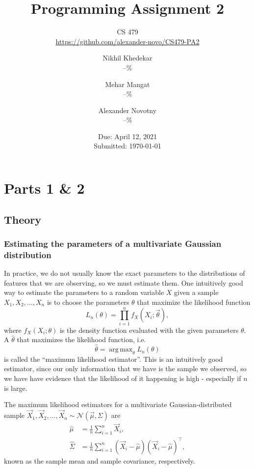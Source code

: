 \documentclass[headings=optiontoheadandtoc,listof=totoc,parskip=full]{scrartcl}
\title{Programming Assignment 2}
\subtitle{CS 479\\\url{https://github.com/alexander-novo/CS479-PA2}}
\author{Nikhil Khedekar\\--\% \and Mehar Mangat\\--\% \and Alexander Novotny\\--\%}
\date{Due: April 12, 2021 \\ Submitted: \today}
\DeclareMathOperator*{\argmax}{arg\,max}
\begin{document}
\maketitle
\tableofcontents
{}

\newpage
{}

\section{Parts 1 \& 2}
\label{sec:part-1}

\subsection{Theory}

\subsubsection{Estimating the parameters of a multivariate Gaussian distribution}
\label{sec:theory-estimators}

In practice, we do not usually know the exact parameters to the distributions of features that we are observing, so we must estimate them. One intuitively good way to estimate the parameters to a random variable $X$ given a sample $X_1, X_2, \dots, X_n$ is to choose the parameters $\theta$ that maximize the likelihood function
\begin{equation}
	L_n(\theta) = \prod_{i = 1}^n f_X(X_i; \vec \theta),
\end{equation}
where $f_X(X_i; \theta)$ is the density function evaluated with the given parameters $\theta$. A $\hat \theta$ that maximizes the likelihood function, i.e.
\begin{equation}
	\hat \theta = \argmax_\theta L_n(\theta)
\end{equation}
is called the ``maximum likelihood estimator''. This is an intuitively good estimator, since our only information that we have is the sample we observed, so we have have evidence that the likelihood of it happening is high - especially if $n$ is large.

The maximum likelihood estimators for a multivariate Gaussian-distributed sample $\vec X_1, \vec X_2, \dots, \vec X_n \sim \mathcal N(\vec \mu, \Sigma)$ are
\begin{align}
	\hat \mu &= \frac{1}{n} \sum_{i = 1}^n \vec X_i,\\
	\hat \Sigma &= \frac{1}{n} \sum_{i = 1}^n (\vec X_i - \hat \mu)(\vec X_i - \hat \mu)^\top,
\end{align}
known as the sample mean and sample covariance, respectively.
\end{document}
